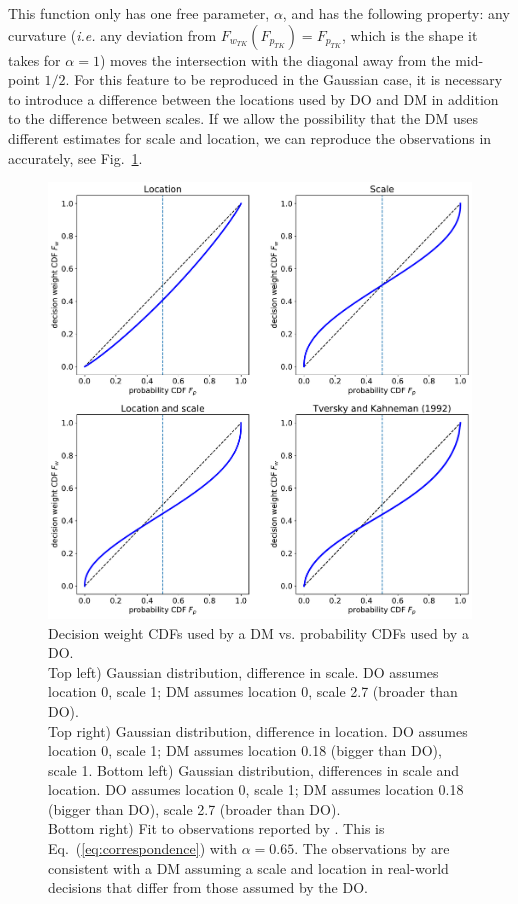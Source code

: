 \documentclass[11pt]{article}
\newcommand{\eref}[1]{Eq.~(\ref{eq:#1})}
\newcommand{\ie}{{\it i.e.}\xspace}
\newcommand{\flabel}[1]{\label{fig:#1}}
\newcommand{\fref}[1]{Fig.~\ref{fig:#1}}
\numberwithin{equation}{section}
\begin{document}
This function 
only has one free parameter, $\alpha$, and has the following property: any curvature (\ie any deviation from $F_{w_{TK}}(F_{p_{TK}})=F_{p_{TK}}$, which is the shape it takes for $\alpha=1$) moves the intersection with the diagonal away from the mid-point $1/2$. For this feature to be reproduced in the Gaussian case, it is necessary to introduce a difference between the locations used by DO and DM in addition to the difference between scales. If we allow the possibility that the DM uses different estimates for scale and location, we can reproduce the observations in \citep{TverskyKahneman1992} accurately, see \fref{CDF_weights}.

\begin{figure}
\centering
\includegraphics[width=1.0\textwidth]{./figs/Gauss_scale_location_both_KT.pdf}
\caption{Decision weight CDFs used by a DM vs. probability CDFs used by a DO.\\ 
Top left) Gaussian distribution, difference in scale. DO assumes location 0, scale 1; DM assumes location 0, scale 2.7 (broader than DO).\\ 
Top right) Gaussian distribution, difference in location. DO assumes location 0, scale 1; DM assumes location 0.18 (bigger than DO), scale 1.
Bottom left) Gaussian distribution, differences in scale and location. DO assumes location 0, scale 1; DM assumes location 0.18 (bigger than DO), scale 2.7 (broader than DO).\\ 
Bottom right) Fit to observations reported by \citet{TverskyKahneman1992}. This is \eref{correspondence} with $\alpha=0.65$.
The observations by \citet{TverskyKahneman1992} are consistent with a DM assuming a scale and location in real-world decisions that differ from those assumed by the DO.}
\flabel{CDF_weights}
\end{figure}
\end{document}
